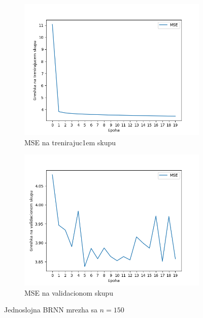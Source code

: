 \documentclass[a4paper, openany, oneside, 11pt]{book}
\begin{document}
\newpage
\begin{figure}[!h]
        \centering
        \begin{subfigure}{0.475\textwidth}
            \centering
            \includegraphics[scale=0.45]{res/BidirectSingleLayerLSTM_120units_train.png}
            \caption{\acrshort{MSE} na trenirajuc1em skupu}
            \label{fig:4_9a}
            \vspace{0pt}
        \end{subfigure}%
        \begin{subfigure}{0.475\textwidth}
            \centering
            \includegraphics[scale=0.45]{res/BidirectSingleLayerLSTM_120units_validation.png}
            \caption{\acrshort{MSE} na validacionom skupu}
            \label{fig:4_9b}
            \vspace{0pt}
        \end{subfigure}
        \caption{Jednoslojna \acrshort{BRNN} mrezha sa $n=150$}
        \label{fig:4_9}
\end{figure}
\end{document}
